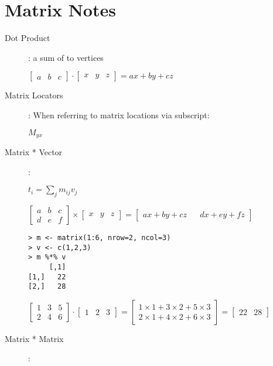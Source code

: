 \documentclass{article}
\begin{document}
\section{Matrix Notes}

\begin{description}

\item[Dot Product]: a sum of to vertices

$
\begin{bmatrix} a & b & c\end{bmatrix}
\cdot
\begin{bmatrix} x & y & z\end{bmatrix}
=
ax + by + cz
$

\item[Matrix Locators]: When referring to matrix locations via
  subscript:

$ M_{yx} $

\item[Matrix * Vector] : 

$t_i = \sum_{j} m_{ij}v_{j}$

$
\begin{bmatrix} a & b & c \\ d & e & f \end{bmatrix}
  \times
\begin{bmatrix} x & y & z\end{bmatrix}
  =
\begin{bmatrix} ax + by + cz && dx + ey + fz \end{bmatrix}
$

\begin{verbatim}
> m <- matrix(1:6, nrow=2, ncol=3)
> v <- c(1,2,3)
> m %*% v
     [,1]
[1,]   22
[2,]   28
\end{verbatim}

$
\begin{bmatrix} 1 & 3 & 5 \\ 2 & 4 & 6 \end{bmatrix}
\cdot
\begin{bmatrix} 1 & 2 & 3 \end{bmatrix}
=
\begin{bmatrix}
  1 \times 1 + 3 \times 2 + 5 \times 3 \\
  2 \times 1 + 4 \times 2 + 6 \times 3
\end{bmatrix}
=
\begin{bmatrix} 22 & 28 \end{bmatrix}
$

\item[Matrix * Matrix] : 


\end{description}
\end{document}
